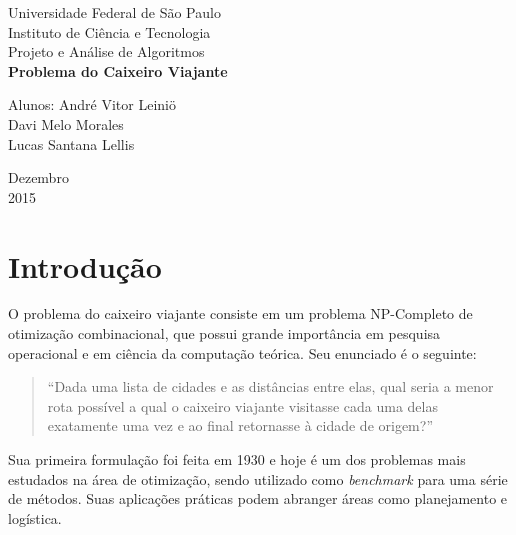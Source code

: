 \documentclass[a4paper, 12pt]{article}
\begin{document}

\begin{titlepage}
	\begin{center}
	

		\Huge{Universidade Federal de São Paulo}\\
		\large{Instituto de Ciência e Tecnologia}\\ 
		\large{Projeto e Análise de Algoritmos}\\ 
		\vspace{15pt}
        \vspace{95pt}
        \textbf{\LARGE{Problema do Caixeiro Viajante}}\\
		\vspace{3,5cm}
	\end{center}
	
	\begin{flushleft}
		\begin{tabbing}
			Alunos: André Vitor Leiniö \\
					\hspace{3.5em}	Davi Melo Morales \\
                   	\hspace{3.5em}	Lucas Santana Lellis
	\end{tabbing}
 \end{flushleft}
	\vspace{1cm}
	
	\begin{center}
		\vspace{\fill}
			 Dezembro\\
		 2015
			\end{center}
\end{titlepage}

\section{Introdução}
O problema do caixeiro viajante consiste em um problema NP-Completo de otimização combinacional\cite{cormen2009introduction}, que possui grande importância em pesquisa operacional e em ciência da computação teórica. Seu enunciado é o seguinte:
\begin{quote}
``Dada uma lista de cidades e as distâncias entre elas, qual seria a menor rota possível a qual o caixeiro viajante visitasse cada uma delas exatamente uma vez e ao final retornasse à cidade de origem?''
\end{quote}
Sua primeira formulação foi feita em 1930 e hoje é um dos problemas mais estudados na área de otimização, sendo utilizado como \textit{benchmark} para uma série de métodos. Suas aplicações práticas podem abranger áreas como planejamento e logística.
\end{document}
